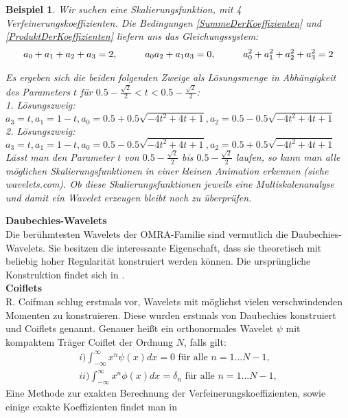 \documentclass[11pt,a4paper,titlepage]{article}
\theoremstyle{plain} %
\newtheorem{beispiel}[satz]{Beispiel}  %
\theoremstyle{definition} %
\numberwithin{equation}{section} %
\begin{document}
		\begin{beispiel}
			Wir suchen eine Skalierungsfunktion, mit 4 Verfeinerungskoeffizienten. Die Bedingungen \ref{SummeDerKoeffizienten} und \ref{ProduktDerKoeffizienten} liefern uns das Gleichungssystem:
			\begin{align}
				a_0+a_1+a_2+a_3 = 2, \hspace*{1cm} a_0 a_2+a_1 a_3 = 0, \hspace*{1cm} a_0^2+a_1^2+a_2^2+a_3^2 = 2
			\end{align}
			
			Es ergeben sich die beiden folgenden Zweige als Lösungsmenge in Abhängigkeit des Parameters $t$ für $0.5-\frac{\sqrt{2}}{2}<t<0.5-\frac{\sqrt{2}}{2}$:\\
			1. Lösungszweig: $a_3=t, a_1=1-t, a_0=0.5+0.5\sqrt{-4t^2+4t+1}, a_2=0.5-0.5\sqrt{-4t^2+4t+1}$\\
			2. Lösungszweig: $a_3=t, a_1=1-t, a_0=0.5-0.5\sqrt{-4t^2+4t+1}, a_2=0.5+0.5\sqrt{-4t^2+4t+1}$\\
			
			Lässt man den Parameter $t$ von  $0.5-\frac{\sqrt{2}}{2}$ bis $0.5-\frac{\sqrt{2}}{2}$ laufen, so kann man alle möglichen Skalierungsfunktionen in einer kleinen Animation erkennen (siehe wavelets.com). Ob diese Skalierungsfunktionen jeweils eine Multiskalenanalyse und damit ein Wavelet erzeugen bleibt noch zu überprüfen.
		\end{beispiel}
		
		
		\textbf{Daubechies-Wavelets}\\
		Die berühmtesten Wavelets der OMRA-Familie sind vermutlich die Daubechies-Wavelets. Sie besitzen die interessante Eigenschaft, dass sie theoretisch mit beliebig hoher Regularität konstruiert werden können. Die ursprüngliche Konstruktion findet sich in \cite{Daubechies1988}. \\
		
		\textbf{Coiflets}\\
		R. Coifman schlug erstmals vor, Wavelets mit möglichst vielen verschwindenden Momenten zu konstruieren. Diese wurden erstmals von Daubechies \cite{Daubechies1990} \cite{Daubechies1992} konstruiert und Coiflets genannt. Genauer heißt ein orthonormales Wavelet $\psi$ mit kompaktem Träger Coiflet der Ordnung $N$, falls gilt:
		\begin{align}
				i) \int_{-\infty}^{\infty}x^n \psi(x) dx = 0 \text{ für alle } n=1...N-1,\\
				ii) \int_{-\infty}^{\infty}x^n \phi(x) dx = \delta_n \text{ für alle } n=1...N-1,
		\end{align} 
		Eine Methode zur exakten Berechnung der Verfeinerungskoeffizienten, sowie einige exakte Koeffizienten findet man in \cite{CernaFinekNajzar2008}\\
		
\end{document}

